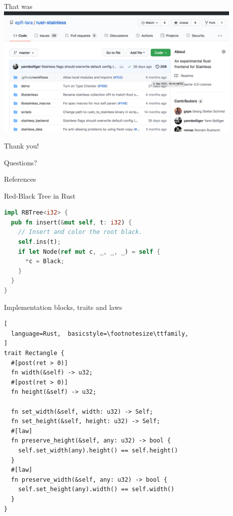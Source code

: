 \begin{frame}{That was}
\centering
\includegraphics[width=0.9\textwidth]{img/github.png}
\end{frame}

\begin{frame}[standout]
Thank you!
\end{frame}

\begin{frame}[standout]
Questions?
\end{frame}


\begin{frame}[allowframebreaks]{References}
  
  
\end{frame}


\appendix

\begin{frame}[fragile]{Red-Black Tree in Rust}
\begin{lstlisting}[language=Rust, caption={Insert method}]
impl RBTree<i32> {
  pub fn insert(&mut self, t: i32) {
    // Insert and color the root black.
    self.ins(t);
    if let Node(ref mut c, _, _, _) = self {
      *c = Black;
    }
  }
}
\end{lstlisting}
\end{frame}

\begin{frame}[fragile]{Implementation blocks, traits and laws}
\begin{lstlisting}[
  language=Rust,  basicstyle=\footnotesize\ttfamily,
]
trait Rectangle {
  #[post(ret > 0)]
  fn width(&self) -> u32;
  #[post(ret > 0)]
  fn height(&self) -> u32;

  fn set_width(&self, width: u32) -> Self;
  fn set_height(&self, height: u32) -> Self;
  #[law]
  fn preserve_height(&self, any: u32) -> bool {
    self.set_width(any).height() == self.height()
  }
  #[law]
  fn preserve_width(&self, any: u32) -> bool {
    self.set_height(any).width() == self.width()
  }
}
\end{lstlisting}
\end{frame}
